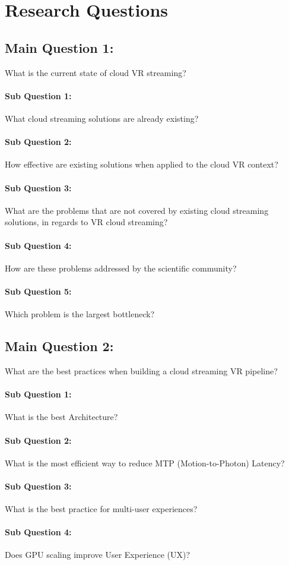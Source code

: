 \section{Research Questions}

\subsection*{Main Question 1:} What is the current state of cloud VR streaming?
\paragraph{Sub Question 1:} What cloud streaming solutions are already existing?
\paragraph{Sub Question 2:} How effective are existing solutions when applied to the cloud VR context?
\paragraph{Sub Question 3:} What are the problems that are not covered by existing cloud streaming solutions, in regards to VR cloud streaming?
\paragraph{Sub Question 4:} How are these problems addressed by the scientific community?
\paragraph{Sub Question 5:} Which problem is the largest bottleneck?

\subsection*{Main Question 2:} What are the best practices when building a cloud streaming VR pipeline?
\paragraph{Sub Question 1:} What is the best Architecture?
\paragraph{Sub Question 2:} What is the most efficient way to reduce MTP (Motion-to-Photon) Latency?
\paragraph{Sub Question 3:} What is the best practice for multi-user experiences?
\paragraph{Sub Question 4:} Does GPU scaling improve User Experience (UX)?
